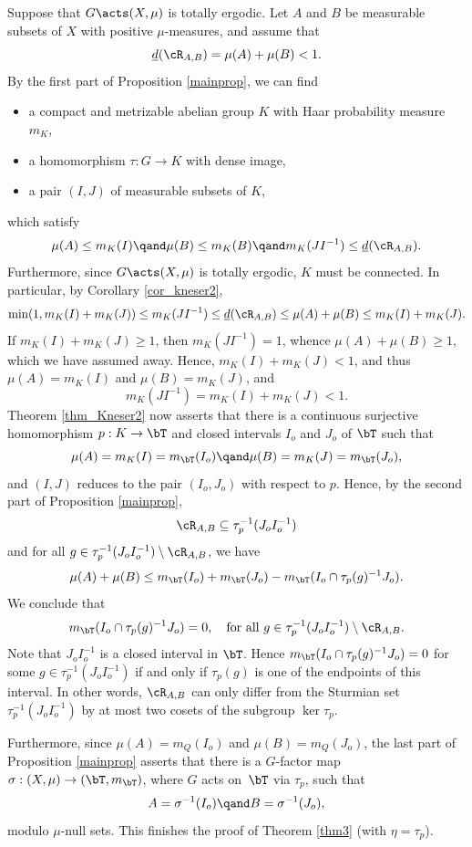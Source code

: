 Suppose that $G \acts (X,\mu)$ is totally ergodic. Let $A$ and $B$ be measurable subsets of $X$ with positive $\mu$-measures,
and assume that
\[
\underline{d}(\cR_{A,B}) = \mu(A) + \mu(B) < 1.
\]
By the first part of Proposition \ref{mainprop}, we can find
\begin{itemize}
\item a compact and metrizable abelian group $K$ with Haar probability measure $m_K$,
\item a homomorphism $\tau : G \to K$ with dense image,
\item a pair $(I,J)$ of measurable subsets of $K$,
\end{itemize}
which satisfy
\[
\mu(A) \leq m_K(I) \qand \mu(B) \leq m_K(B) \qand m_K(JI^{-1}) \leq \underline{d}(\cR_{A,B}).
\]
Furthermore, since $G \acts (X,\mu)$ is totally ergodic, $K$ must be connected. In particular, by
Corollary \ref{cor_kneser2},
\[
\min(1,m_K(I) + m_K(J)) \leq m_K(JI^{-1}) \leq \underline{d}(\cR_{A,B}) \leq \mu(A) + \mu(B) \leq m_K(I) + m_K(J).
\]
If $m_K(I) + m_K(J) \geq 1$, then $m_K(JI^{-1}) = 1$, whence $\mu(A) + \mu(B) \geq 1$, which we have assumed away.
Hence, $m_K(I) + m_K(J) < 1$, and thus $\mu(A) = m_K(I)$ and $\mu(B) = m_K(J)$, and
\[
m_K(JI^{-1}) = m_K(I) + m_K(J) < 1.
\]
Theorem \ref{thm_Kneser2} now asserts
that there is a continuous surjective homomorphism \hbox{$p : K \to \bT$} and closed intervals $I_o$ and $J_o$ of $\bT$
such that
\[
\mu(A) = m_K(I) = m_\bT(I_o) \qand \mu(B) = m_K(J) = m_\bT(J_o),
\]
and $(I,J)$ reduces to the pair $(I_o,J_o)$ with respect to $p$. Hence, by the second part of Proposition \ref{mainprop},
\[
\cR_{A,B} \subseteq \tau_p^{-1}(J_o I_o^{-1})
\]
and for all $g \in \tau_p^{-1}(J_o I_o^{-1}) \setminus \cR_{A,B}$, we have
\[
\mu(A) + \mu(B) \leq m_\bT(I_o) + m_\bT(J_o) - m_\bT(I_o \cap \tau_p(g)^{-1}J_o).
\]
We conclude that
\[
m_\bT(I_o \cap \tau_p(g)^{-1}J_o) = 0, \quad \textrm{for all $g \in \tau_p^{-1}(J_o I_o^{-1}) \setminus \cR_{A,B}$}.
\]
Note that $J_o I_o^{-1}$ is a closed interval in $\bT$. Hence $m_\bT(I_o \cap \tau_p(g)^{-1}J_o) = 0$ for some
$g \in \tau_p^{-1}(J_o I_o^{-1})$ if and only if $\tau_p(g)$ is one of the endpoints of this interval. In other words,
$\cR_{A,B}$ can only differ from the Sturmian set $\tau_p^{-1}(J_o I_o^{-1})$ by at most two cosets of the
subgroup $\ker \tau_p$.

Furthermore, since $\mu(A) = m_Q(I_o)$ and $\mu(B) = m_Q(J_o)$, the last part of Proposition \ref{mainprop} asserts
that there is a $G$-factor map $\sigma : (X,\mu) \to (\bT,m_{\bT})$, where $G$ acts on~$\bT$ via $\tau_p$, such that
\[
A = \sigma^{-1}(I_o) \qand B = \sigma^{-1}(J_o),
\]
modulo $\mu$-null sets. This finishes the proof of Theorem \ref{thm3} (with $\eta = \tau_p$).

